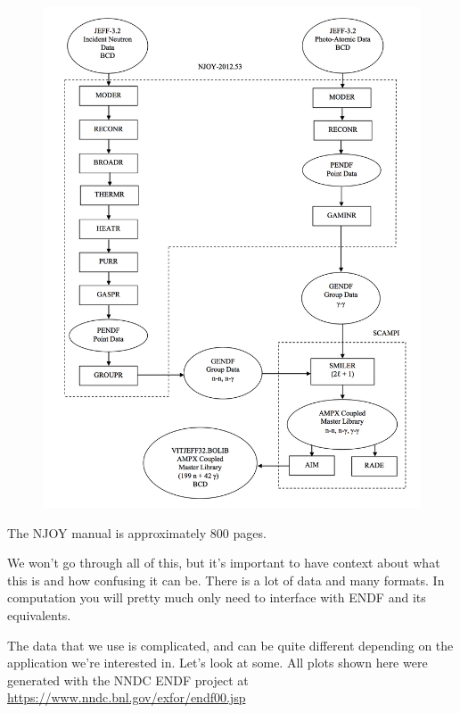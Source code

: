 \documentclass[12pt]{article}
\begin{document}
\begin{figure}[h!]
    \begin{center}
    \includegraphics[keepaspectratio, width = \textwidth]{data-flow}
    \end{center}
\end{figure}
\pagebreak

The NJOY manual is approximately 800 pages.

We won't go through all of this, but it's important to have context 
about what this is and how confusing it can be. There is a lot of data and 
many formats. In computation you will pretty much only need to interface with 
ENDF and its equivalents. 

The data that we use is complicated, and can be quite different depending on 
the application we're interested in. Let's look at some. All plots shown here
were generated with the NNDC ENDF project at
\url{https://www.nndc.bnl.gov/exfor/endf00.jsp}
\end{document}
